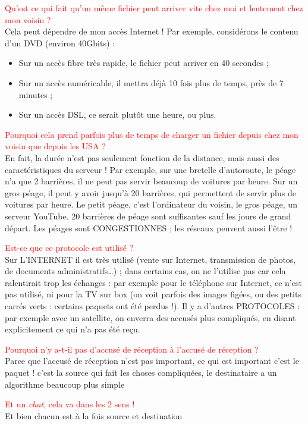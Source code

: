 \documentclass[10pt,a4paper]{article}
\newcommand{\question}[2]{\noindent \textcolor{red}{#1}\\ #2}
\begin{document}
\question{Qu’est ce qui fait qu’un même fichier peut arriver vite chez moi et
lentement chez mon voisin ?}{Cela peut dépendre de mon accès Internet ! Par
  exemple, considérons le contenu d’un DVD (environ 40Gbits) :
\begin{itemize}
  \item Sur un accès fibre très rapide, le fichier peut arriver en 40 secondes
    ;
  \item Sur un accès numéricable, il mettra déjà 10 fois plus de temps, près de
    7 minutes ;
  \item Sur un accès DSL, ce serait plutôt une heure, ou plus.
\end{itemize}
}

\question{Pourquoi cela prend parfois plus de temps de charger un fichier depuis chez
mon voisin que depuis les USA ?}{En fait, la durée n’est pas seulement fonction
  de la distance, mais aussi des caractéristiques du serveur !  Par exemple,
  sur une bretelle d’autoroute, le péage n’a que 2 barrières, il ne peut pas
  servir beaucoup de voitures par heure. Sur un gros péage, il peut y avoir
  jusqu’à 20 barrières, qui permettent de servir plus de voitures par heure. Le
  petit péage, c’est l’ordinateur du voisin, le gros péage, un serveur YouTube.
20 barrières de péage sont suffisantes sauf les jours de grand départ. Les
péages sont CONGESTIONNES ; les réseaux peuvent aussi l’être !}


\question{Est-ce que ce protocole est utilisé ?}{Sur L’INTERNET il est très
utilisé (vente sur Internet, transmission de photos, de documents
administratifs…) ; dans certains cas, on ne l’utilise pas car cela ralentirait
trop les échanges : par exemple pour le téléphone sur Internet, ce n’est pas
utilisé, ni pour la TV sur box (on voit parfois des images figées, ou des
petits carrés verts : certains paquets ont été perdus !).  Il y a d’autres
PROTOCOLES : par exemple avec un satellite, on enverra des accusés plus
compliqués, en disant explicitement ce qui n’a pas été reçu.}


\question{Pourquoi n’y a-t-il pas d’accusé de réception à l’accusé de réception
?}{Parce que l’accusé de réception n’est pas important, ce qui est important
c’est le paquet ! c’est la source qui fait les choses compliquées, le
destinataire a un algorithme beaucoup plus simple}


\question{Et un \emph{chat}, cela va dans les 2 sens !}{Et bien chacun est à la fois
source et destination}
\end{document}
